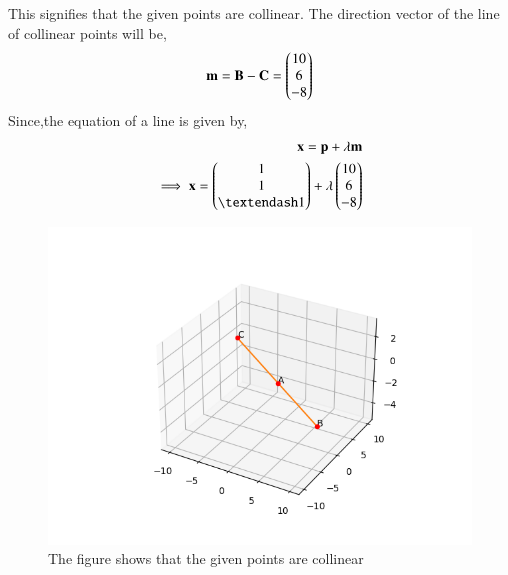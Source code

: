 \documentclass[A4,10pt,twocolumn]{IEEEtran}
\begin{document}
This signifies that the given points are collinear.
The direction vector of the line of collinear points will be,
\begin{align}
\mathbf{m}=\mathbf{B}-\mathbf{C} = \begin{pmatrix}10\\6\\-8\end{pmatrix}
\end{align}
Since,the equation of a line is given by,
\begin{align}
\vec{x}=\vec{p}+  \lambda \vec{m}\\
\implies \vec{x}= \myvec{1\\1\\– 1} + \lambda \myvec{10\\6\\-8}
\end{align}
\begin{figure}[h!]
  \centering
   \includegraphics[width=\columnwidth]{figs/collinear_points.png}
    \caption{The figure shows that the given points are collinear}
     \label{fig:1}
     \end{figure}
\end{document}
